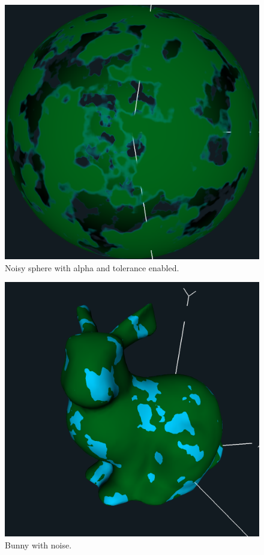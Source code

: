 \documentclass[12pt,letterpaper]{article}
\begin{document}
\begin{figure}[!h]
    \centering
    \includegraphics[width=1.0\textwidth]{img/sphere_alpha_tol.png}
    \caption{Noisy sphere with alpha and tolerance enabled.}
    \label{fig:spherealphatol}
\end{figure}

\begin{figure}[!h]
    \centering
    \includegraphics[width=1.0\textwidth]{img/bunny_noise.png}
    \caption{Bunny with noise.}
    \label{fig:bunnynoise}
\end{figure}
\end{document}
